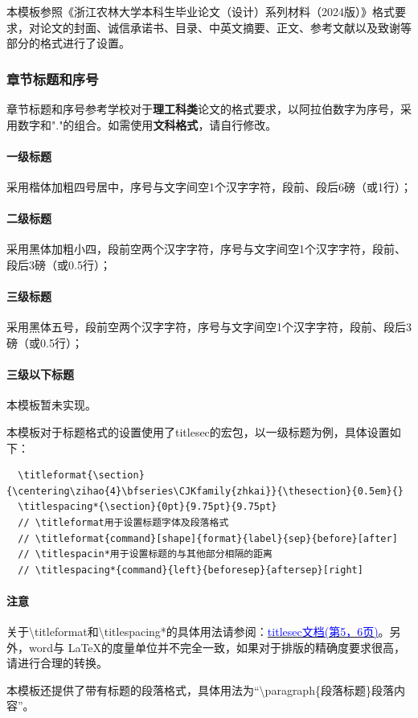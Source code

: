 \documentclass[AutoFakeBold]{ZafuThesis}
\begin{document}
本模板参照《浙江农林大学本科生毕业论文（设计）系列材料（2024版）》格式要求，对论文的封面、诚信承诺书、目录、中英文摘要、正文、参考文献以及致谢等部分的格式进行了设置。

\subsubsection{章节标题和序号}

章节标题和序号参考学校对于\textbf{理工科类}论文的格式要求，以阿拉伯数字为序号，采用数字和"."的组合。如需使用\textbf{文科格式}，请自行修改。
\paragraph{一级标题}采用楷体加粗四号居中，序号与文字间空1个汉字字符，段前、段后6磅（或1行）；
\paragraph{二级标题}采用黑体加粗小四，段前空两个汉字字符，序号与文字间空1个汉字字符，段前、段后3磅（或0.5行）；
\paragraph{三级标题}采用黑体五号，段前空两个汉字字符，序号与文字间空1个汉字字符，段前、段后3磅（或0.5行）；
\paragraph{三级以下标题}本模板暂未实现。

\par 本模板对于标题格式的设置使用了titlesec的宏包，以一级标题为例，具体设置如下：
\begin{lstlisting}
  \titleformat{\section}{\centering\zihao{4}\bfseries\CJKfamily{zhkai}}{\thesection}{0.5em}{}
  \titlespacing*{\section}{0pt}{9.75pt}{9.75pt}
  // \titleformat用于设置标题字体及段落格式 
  // \titleformat{command}[shape]{format}{label}{sep}{before}[after]
  // \titlespacin*用于设置标题的与其他部分相隔的距离
  // \titlespacing*{command}{left}{beforesep}{aftersep}[right]
\end{lstlisting}
\paragraph{注意} 关于\textbackslash titleformat和\textbackslash titlespacing*的具体用法请参阅：\href{https://static.latexstudio.net/wp-content/uploads/2016/12/titlesec_c.pdf}{\textcolor{blue}{titlesec文档(第5，6页)}}。另外，word与 \LaTeX 的度量单位并不完全一致，如果对于排版的精确度要求很高，请进行合理的转换。
\par 本模板还提供了带有标题的段落格式，具体用法为“\textbackslash paragraph\{段落标题\}段落内容”。
\end{document}

